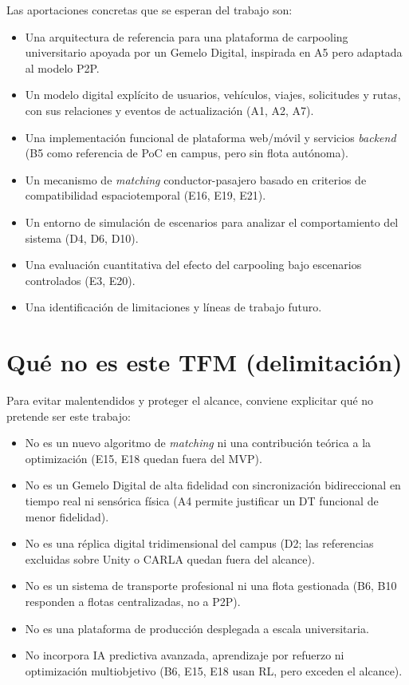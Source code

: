 Las aportaciones concretas que se esperan del trabajo son:
\begin{itemize}
    \item Una arquitectura de referencia para una plataforma de carpooling universitario apoyada por un Gemelo Digital, inspirada en A5 pero adaptada al modelo P2P.
    \item Un modelo digital explícito de usuarios, vehículos, viajes, solicitudes y rutas, con sus relaciones y eventos de actualización (A1, A2, A7).
    \item Una implementación funcional de plataforma web/móvil y servicios \textit{backend} (B5 como referencia de PoC en campus, pero sin flota autónoma).
    \item Un mecanismo de \textit{matching} conductor-pasajero basado en criterios de compatibilidad espaciotemporal (E16, E19, E21).
    \item Un entorno de simulación de escenarios para analizar el comportamiento del sistema (D4, D6, D10).
    \item Una evaluación cuantitativa del efecto del carpooling bajo escenarios controlados (E3, E20).
    \item Una identificación de limitaciones y líneas de trabajo futuro.
\end{itemize}

\section{Qué no es este TFM (delimitación)}

Para evitar malentendidos y proteger el alcance, conviene explicitar qué no pretende ser este trabajo:
\begin{itemize}
    \item No es un nuevo algoritmo de \textit{matching} ni una contribución teórica a la optimización (E15, E18 quedan fuera del MVP).
    \item No es un Gemelo Digital de alta fidelidad con sincronización bidireccional en tiempo real ni sensórica física (A4 permite justificar un DT funcional de menor fidelidad).
    \item No es una réplica digital tridimensional del campus (D2; las referencias excluidas sobre Unity o CARLA quedan fuera del alcance).
    \item No es un sistema de transporte profesional ni una flota gestionada (B6, B10 responden a flotas centralizadas, no a P2P).
    \item No es una plataforma de producción desplegada a escala universitaria.
    \item No incorpora IA predictiva avanzada, aprendizaje por refuerzo ni optimización multiobjetivo (B6, E15, E18 usan RL, pero exceden el alcance).
\end{itemize}

